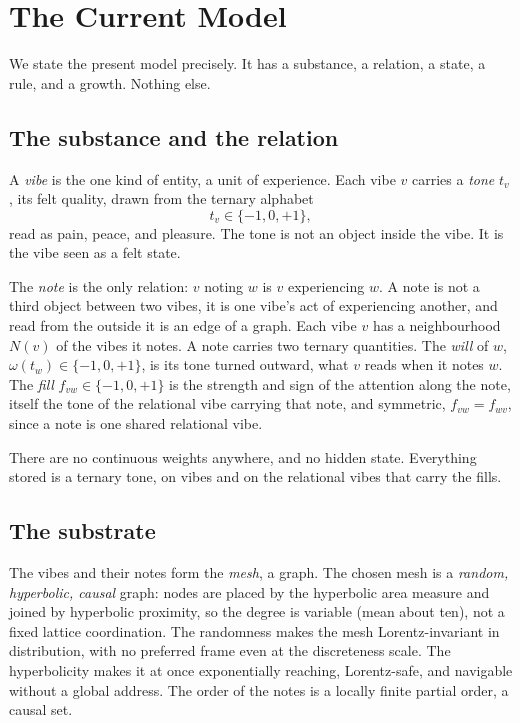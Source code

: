 \section{The Current Model}
\label{sec:model}

We state the present model precisely. It has a substance, a relation, a state, a
rule, and a growth. Nothing else.

\subsection{The substance and the relation}

\begin{definition}
A \emph{vibe} is the one kind of entity, a unit of experience. Each vibe $v$ carries a
\emph{tone} $t_v$, its felt quality, drawn from the ternary alphabet
\[
t_v \in \{-1, 0, +1\},
\]
read as pain, peace, and pleasure. The tone is not an object inside the vibe. It is the
vibe seen as a felt state.
\end{definition}

\begin{definition}
The \emph{note} is the only relation: $v$ noting $w$ is $v$ experiencing $w$. A note is
not a third object between two vibes, it is one vibe's act of experiencing another, and
read from the outside it is an edge of a graph. Each vibe $v$ has a neighbourhood $N(v)$
of the vibes it notes. A note carries two ternary quantities. The \emph{will} of $w$,
$\omega(t_w) \in \{-1,0,+1\}$, is its tone turned outward, what $v$ reads when it notes
$w$. The \emph{fill} $f_{vw} \in \{-1,0,+1\}$ is the strength and sign of the attention
along the note, itself the tone of the relational vibe carrying that note, and symmetric,
$f_{vw} = f_{wv}$, since a note is one shared relational vibe.
\end{definition}

There are no continuous weights anywhere, and no hidden state. Everything stored is a
ternary tone, on vibes and on the relational vibes that carry the fills.

\subsection{The substrate}

\begin{definition}
The vibes and their notes form the \emph{mesh}, a graph. The chosen mesh is a
\emph{random, hyperbolic, causal} graph: nodes are placed by the hyperbolic area
measure and joined by hyperbolic proximity, so the degree is variable (mean about ten),
not a fixed lattice coordination. The randomness makes the mesh Lorentz-invariant in
distribution, with no preferred frame even at the discreteness scale. The hyperbolicity
makes it at once exponentially reaching, Lorentz-safe, and navigable without a global
address. The order of the notes is a locally finite partial order, a causal set.
\end{definition}

